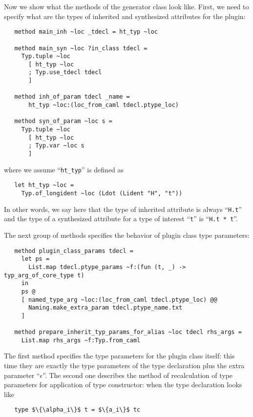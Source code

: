 Now we show what the methods of the generator class look like. First, we need to specify what are the types of inherited and
synthesized attributes for the plugin:

\begin{lstlisting}
   method main_inh ~loc _tdecl = ht_typ ~loc

   method main_syn ~loc ?in_class tdecl =
     Typ.tuple ~loc
       [ ht_typ ~loc
       ; Typ.use_tdecl tdecl
       ]

   method inh_of_param tdecl _name =
       ht_typ ~loc:(loc_from_caml tdecl.ptype_loc)

   method syn_of_param ~loc s =
     Typ.tuple ~loc
       [ ht_typ ~loc
       ; Typ.var ~loc s
       ]
\end{lstlisting}

where we assume ``\lstinline{ht_typ}'' is defined as

\begin{lstlisting}
   let ht_typ ~loc =
     Typ.of_longident ~loc (Ldot (Lident "H", "t"))
\end{lstlisting}

In other words, we say here that the type of inherited attribute is always ``\lstinline{H.t}'' and the type of a synthesized attribute for
a type of interest ``\lstinline{t}'' is ``\lstinline{H.t * t}''.

The next group of methods specifies the behavior of plugin class type parameters:

\begin{lstlisting}
   method plugin_class_params tdecl =
     let ps =
       List.map tdecl.ptype_params ~f:(fun (t, _) -> typ_arg_of_core_type t)
     in
     ps @
     [ named_type_arg ~loc:(loc_from_caml tdecl.ptype_loc) @@
       Naming.make_extra_param tdecl.ptype_name.txt
     ]

   method prepare_inherit_typ_params_for_alias ~loc tdecl rhs_args =
     List.map rhs_args ~f:Typ.from_caml
\end{lstlisting}

The first method specifies the type parameters for the plugin class itself: this time they are exactly the type parameters of the type declaration plus
the extra parameter ``$\epsilon$''. The second one describes the method of recalculation of type parameters for application of type constructor: when
the type declaration looks like

\begin{lstlisting}
   type $\{\alpha_i\}$ t = $\{a_i\}$ tc
\end{lstlisting}


